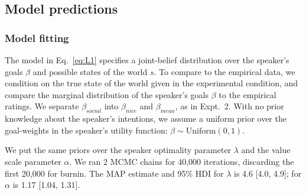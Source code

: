 \documentclass[10pt,letterpaper]{article}
\begin{document}

\subsection{Model predictions}

\subsubsection{Model fitting}

The model in Eq.~\ref{eq:L1} specifies a joint-belief distribution over the speaker's goals $\beta$ and possible states of the world $s$.
To compare to the empirical data, we condition on the true state of the world given in the experimental condition, and compare the marginal distribution of the speaker's goals $\beta$ to the empirical ratings.
We separate $\beta_{social}$ into  $\beta_{nice}$ and  $\beta_{mean}$, as in Expt.~2.
With no prior knowledge about the speaker's intentions, we assume a uniform prior over the goal-weights in the speaker's utility function: $\beta \sim \text{Uniform}(0,1)$.

We put the same priors over the speaker optimality parameter $\lambda$ and the value scale parameter $\alpha$.
We ran 2 MCMC chains for 40,000 iterations, discarding the first 20,000 for burnin.
The MAP estimate and 95\% HDI for $\lambda$ is 4.6 [4.0, 4.9]; for $\alpha$ is 1.17 [1.04, 1.31].%

\end{document}
